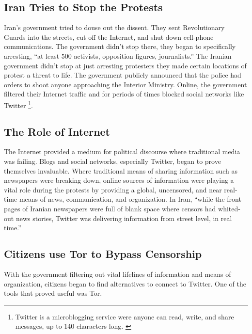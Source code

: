 \documentclass[11pt]{article}
\begin{document}
\begin{multicols}{2}
\subsection{Iran Tries to Stop the Protests}

Iran's government tried to douse out the dissent. They sent
Revolutionary Guards into the streets, cut off the Internet, and shut down
cell-phone communications. \cite{TheIranianVote} The government didn't stop
there, they began to specifically arresting, ``at least 500 activists,
opposition figures, journalists.'' \cite{IranProtestsFifthDayOfUnrest} The
Iranian government didn't stop at just arresting protesters they made certain
locations of protest a threat to life. The government publicly announced that
the police had orders to shoot anyone approaching the Interior Ministry.
\cite{TheIranianVote} Online, the government filtered their Internet traffic and
for periods of times blocked social networks like Twitter \footnote{Twitter is a
microblogging service were anyone can read, write, and share messages, up to 140
characters long.  \cite{WhatIsTwitter}}.  \cite{IranBlocksFacebookTwitter}

\subsection{The Role of Internet}

The Internet provided a medium for political discourse where traditional media
was failing. Blogs and social networks, especially Twitter, began to prove
themselves invaluable.  Where traditional means of sharing information such as
newspapers were breaking down, online sources of information were playing a
vital role during the protests by providing a global, uncensored, and near
real-time means of news, communication, and organization.  In Iran, ``while the
front pages of Iranian newspapers were full of blank space where censors had
whited-out news stories, Twitter was delivering information from street level,
in real time.'' \cite{WhyTwitterIsTheMedium}

\subsection{Citizens use Tor to Bypass Censorship}

With the government filtering out vital lifelines of information and means of
organization, citizens began to find alternatives to connect to Twitter.
\cite{FindingWayAroundIranianCensorship} One of the tools that proved useful was
Tor.


\end{multicols}
\end{document}
